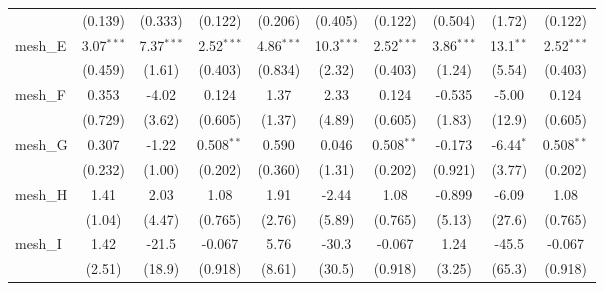 \begin{tabular}{lccccccccc}
                                                               & (0.139)        & (0.333)       & (0.122)        & (0.206)        & (0.405)      & (0.122)        & (0.504)       & (1.72)        & (0.122)\\   
   mesh\_E                                                     & 3.07$^{***}$   & 7.37$^{***}$  & 2.52$^{***}$   & 4.86$^{***}$   & 10.3$^{***}$ & 2.52$^{***}$   & 3.86$^{***}$  & 13.1$^{**}$   & 2.52$^{***}$\\   
                                                               & (0.459)        & (1.61)        & (0.403)        & (0.834)        & (2.32)       & (0.403)        & (1.24)        & (5.54)        & (0.403)\\   
   mesh\_F                                                     & 0.353          & -4.02         & 0.124          & 1.37           & 2.33         & 0.124          & -0.535        & -5.00         & 0.124\\   
                                                               & (0.729)        & (3.62)        & (0.605)        & (1.37)         & (4.89)       & (0.605)        & (1.83)        & (12.9)        & (0.605)\\   
   mesh\_G                                                     & 0.307          & -1.22         & 0.508$^{**}$   & 0.590          & 0.046        & 0.508$^{**}$   & -0.173        & -6.44$^{*}$   & 0.508$^{**}$\\   
                                                               & (0.232)        & (1.00)        & (0.202)        & (0.360)        & (1.31)       & (0.202)        & (0.921)       & (3.77)        & (0.202)\\   
   mesh\_H                                                     & 1.41           & 2.03          & 1.08           & 1.91           & -2.44        & 1.08           & -0.899        & -6.09         & 1.08\\   
                                                               & (1.04)         & (4.47)        & (0.765)        & (2.76)         & (5.89)       & (0.765)        & (5.13)        & (27.6)        & (0.765)\\   
   mesh\_I                                                     & 1.42           & -21.5         & -0.067         & 5.76           & -30.3        & -0.067         & 1.24          & -45.5         & -0.067\\   
                                                               & (2.51)         & (18.9)        & (0.918)        & (8.61)         & (30.5)       & (0.918)        & (3.25)        & (65.3)        & (0.918)\\   

\end{tabular}
